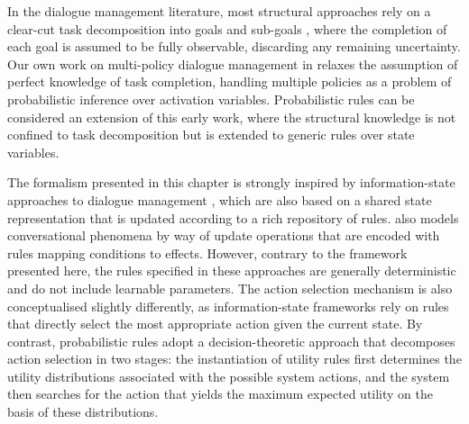In the dialogue management literature, most structural approaches rely on a clear-cut task decomposition into goals and sub-goals \citep{Allen:2000:AGD:973935.973937,Steedman-Petrick:07,Bohus:2009}, where the completion of each goal is assumed to be fully observable, discarding any remaining uncertainty.  Our own work on multi-policy dialogue management in \cite{multipolicy-sigdial2011} relaxes the assumption of perfect knowledge of task completion, handling multiple policies as a problem of probabilistic inference over activation variables.  Probabilistic rules can be considered an extension of this early work, where the structural knowledge is not confined to task decomposition but is extended to generic rules over state variables.  

The formalism presented in this chapter is strongly inspired by information-state approaches to dialogue management \citep{Larsson:2000,Bos2003}, which are also based on a shared state representation that is updated according to a rich repository of rules.  \cite{Ginzburg2012} also models conversational phenomena by way of update operations that are encoded with rules mapping conditions to effects. However, contrary to the framework presented here, the rules specified in these approaches are generally deterministic and do not include learnable parameters. The action selection mechanism is also conceptualised slightly differently, as information-state frameworks rely on rules that directly select the most appropriate action given the current state. By contrast, probabilistic rules adopt a decision-theoretic approach that decomposes action selection in two stages: the instantiation of utility rules first determines the utility distributions associated with the possible system actions, and the system then searches for the action that yields the maximum expected utility on the basis of these distributions.  

